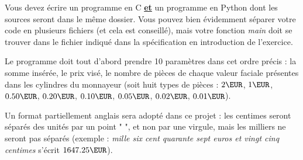 

%
%

\vspace{0.7cm}

\noindent {}

\bigskip

\noindent Vous devez écrire un programme en C \underline{\textbf{et}} un programme en Python dont les sources seront dans le même dossier.
%
\noindent Vous pouvez bien évidemment séparer votre code en plusieurs fichiers (et cela est conseillé), mais votre fonction \textit{main} doit se trouver dans le fichier indiqué dans la spécification en introduction de l'exercice.

\bigskip

\noindent Le programme doit tout d'abord prendre 10 paramètres dans cet ordre précis : la somme insérée, le prix visé, le nombre de pièces de chaque valeur faciale présentes dans les cylindres du monnayeur (soit huit types de pièces : $ 2 \EUR $, $ 1 \EUR $, $ 0.50 \EUR $, $ 0.20 \EUR $, $ 0.10 \EUR $, $ 0.05 \EUR $, $ 0.02 \EUR $, $ 0.01 \EUR $).

\medskip

\noindent Un format partiellement anglais sera adopté dans ce projet : les centimes seront séparés des unités par un point "  ", et non par une virgule, mais les milliers ne seront pas séparés (exemple : \textit{mille six cent quarante sept euros et vingt cinq centimes} s'écrit $ 1647.25 \EUR $).

